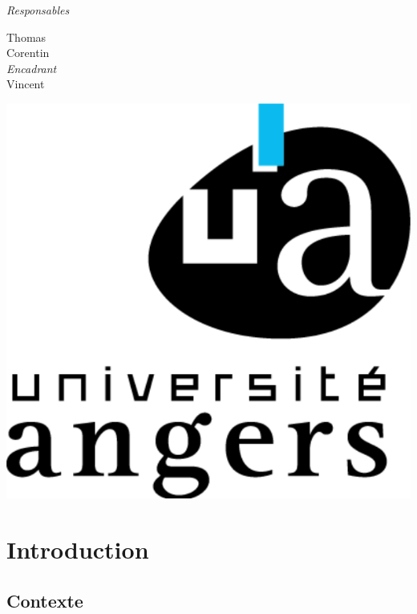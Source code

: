 \documentclass{report}
\begin{document}
\begin{titlepage}
\begin{center}
	\vspace{0.5cm}
	\emph{Responsables}\\
	\vspace{0.1cm}

	Thomas \\
	Corentin \\
	
	\vspace{0.5cm}
	\emph{Encadrant}\\
	\vspace{0.1cm}
	Vincent 
	\end{center}		
	
		
	\vspace{2cm}
	\hspace{15cm}\includegraphics[scale = 0.1]{img/logo.png}

    
    
\end{titlepage}


\tableofcontents

\chapter{Introduction}

	\section{Contexte}
		 \label{contexte}
	
\end{document}
